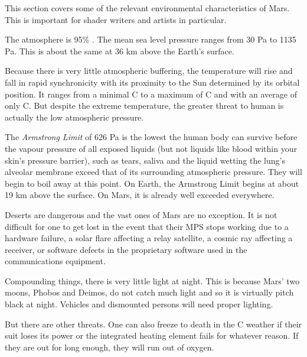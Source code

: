 

This section covers some of the relevant environmental characteristics of Mars. This is important for shader writers and artists in particular.

The atmosphere is 95\% . The mean sea level pressure ranges from 30 Pa to 1135 Pa. This is about the same at 36 km above the Earth's surface. 

Because there is very little atmospheric buffering, the temperature will rise and fall in rapid synchronicity with its proximity to the Sun determined by its orbital position. It ranges from a minimal C to a maximum of C and with an average of only C. But despite the extreme temperature, the greater threat to human is actually the low atmospheric pressure. 

The {\it Armstrong Limit} of 626 Pa is the lowest the human body can survive before the vapour pressure of all exposed liquids (but not liquids like blood within your skin's pressure barrier), such as tears, saliva and the liquid wetting the lung's alveolar membrane exceed that of its surrounding atmospheric pressure. They will begin to boil away at this point. On Earth, the Armstrong Limit begins at about 19 km above the surface. On Mars, it is already well exceeded everywhere.

Deserts are dangerous and the vast ones of Mars are no exception. It is not difficult for one to get lost in the event that their MPS stops working due to a hardware failure, a solar flare affecting a relay satellite, a cosmic ray affecting a receiver, or software defects in the proprietary software used in the communications equipment.

Compounding things, there is very little light at night. This is because Mars' two moons, Phobos and Deimos, do not catch much light and so it is virtually pitch black at night. Vehicles and dismounted persons will need proper lighting. 

But there are other threats. One can also freeze to death in the C weather if their suit loses its power or the integrated heating element fails for whatever reason. If they are out for long enough, they will run out of oxygen.


